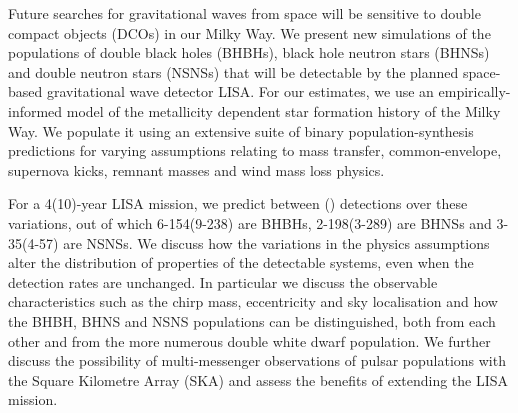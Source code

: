 Future searches for gravitational waves from space will be sensitive to double compact objects (DCOs) in our Milky Way. We present new simulations of the populations of double black holes (BHBHs), black hole neutron stars (BHNSs) and double neutron stars (NSNSs) that will be detectable by the planned space-based gravitational wave detector LISA. 
%
For our estimates, we use an empirically-informed model of the metallicity dependent star formation history of the Milky Way. We populate it using an extensive suite of binary population-synthesis predictions for varying assumptions relating to mass transfer, common-envelope, supernova kicks, remnant masses and wind mass loss physics. 


For a 4(10)-year LISA mission, we predict between \rangeFourYear{}(\rangeTenYear{}) detections over these variations, out of which 6-154(9-238) are BHBHs, 2-198(3-289) are BHNSs and 3-35(4-57) are NSNSs.
%
We discuss how the variations in the physics assumptions alter the distribution of properties of the detectable systems, even when the detection rates are unchanged. In particular we discuss the observable characteristics such as the chirp mass, eccentricity and sky localisation and how the BHBH, BHNS and NSNS populations can be distinguished, both from each other and from the more numerous double white dwarf population. 
%
We further discuss the possibility of multi-messenger observations of pulsar populations with the Square Kilometre Array (SKA) and assess the benefits of extending the LISA mission. 

